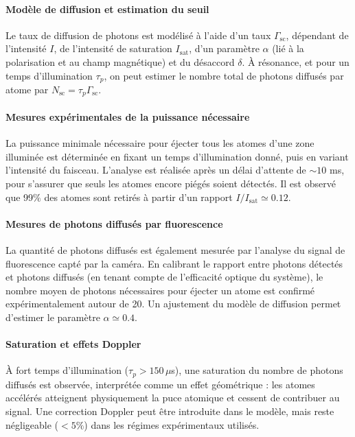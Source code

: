 \paragraph{Modèle de diffusion et estimation du seuil}

Le taux de diffusion de photons est modélisé à l’aide d’un taux \(\Gamma_{\mathrm{sc}}\), dépendant de l’intensité \(I\), de l’intensité de saturation \(I_{\mathrm{sat}}\), d’un paramètre \(\alpha\) (lié à la polarisation et au champ magnétique) et du désaccord \(\delta\). À résonance, et pour un temps d’illumination \(\tau_p\), on peut estimer le nombre total de photons diffusés par atome par \(N_{\mathrm{sc}} = \tau_p \Gamma_{\mathrm{sc}}\).

\paragraph{Mesures expérimentales de la puissance nécessaire}

La puissance minimale nécessaire pour éjecter tous les atomes d’une zone illuminée est déterminée en fixant un temps d’illumination donné, puis en variant l’intensité du faisceau. L’analyse est réalisée après un délai d’attente de \(\sim 10\) ms, pour s’assurer que seuls les atomes encore piégés soient détectés. Il est observé que 99$\%$ des atomes sont retirés à partir d’un rapport \(I/I_{\mathrm{sat}} \simeq 0.12\).

\paragraph{Mesures de photons diffusés par fluorescence}

La quantité de photons diffusés est également mesurée par l’analyse du signal de fluorescence capté par la caméra. En calibrant le rapport entre photons détectés et photons diffusés (en tenant compte de l’efficacité optique du système), le nombre moyen de photons nécessaires pour éjecter un atome est confirmé expérimentalement autour de 20. Un ajustement du modèle de diffusion permet d’estimer le paramètre \(\alpha \simeq 0.4\).

\paragraph{Saturation et effets Doppler}

À fort temps d’illumination (\(\tau_p > 150\,\mu\)s), une saturation du nombre de photons diffusés est observée, interprétée comme un effet géométrique : les atomes accélérés atteignent physiquement la puce atomique et cessent de contribuer au signal. Une correction Doppler peut être introduite dans le modèle, mais reste négligeable (\(< 5\%\)) dans les régimes expérimentaux utilisés.

